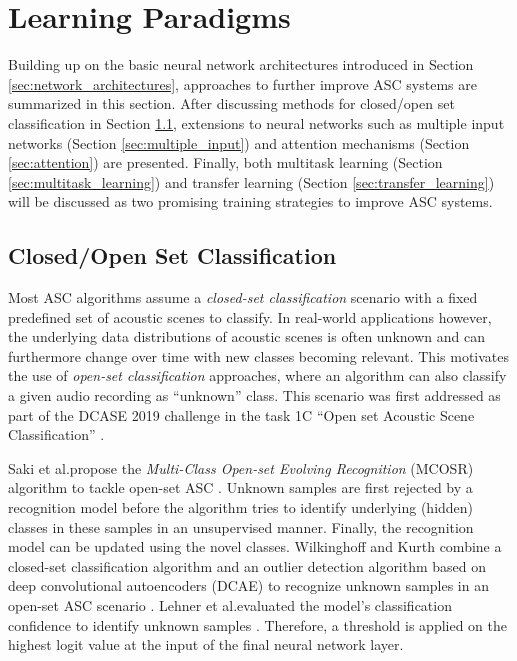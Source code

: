 \documentclass[applsci,article,submit,oneauthor,pdftex]{Definitions/mdpi}
\makeatletter
\newcommand{\etal}{{et al}.\@ }
\newcommand{\secref}[1]{{Section \ref{#1}}}
\makeatother
\begin{document}
\section{Learning Paradigms}
\label{sec:learning_paradigms}
Building up on the basic neural network architectures introduced in \secref{sec:network_architectures}, approaches to further improve ASC systems are summarized in this section.
After discussing methods for closed/open set classification in \secref{sec:open_closed_set}, extensions to neural networks such as multiple input networks (\secref{sec:multiple_input}) and attention mechanisms (\secref{sec:attention}) are presented.
Finally, both multitask learning (\secref{sec:multitask_learning}) and transfer learning (\secref{sec:transfer_learning}) will be discussed as two promising training strategies to improve ASC systems.

\subsection{Closed/Open Set Classification}
\label{sec:open_closed_set}

Most ASC algorithms assume a \textit{closed-set classification} scenario with a fixed predefined set of acoustic scenes to classify.
In real-world applications however, the underlying data distributions of acoustic scenes is often unknown and can furthermore change over time with new classes becoming relevant.
This motivates the use of \textit{open-set classification} approaches, where an  algorithm can also classify a given audio recording as ``unknown'' class.
This scenario was first addressed as part of the DCASE 2019 challenge in the task 1C ``Open set Acoustic Scene Classification'' \citep{Mesaros:2019:ClosedOpenSet:DCASE}.

Saki \etal propose the \textit{Multi-Class Open-set Evolving Recognition} (MCOSR) algorithm to tackle open-set ASC \citep{Saki:2019:OpenSetASC:DCASE}.
Unknown samples are first rejected by a recognition model before the algorithm tries to identify underlying (hidden) classes in these samples in an unsupervised manner. 
Finally, the recognition model can be updated using the novel classes.
Wilkinghoff and Kurth combine a closed-set classification algorithm and an outlier detection algorithm based on deep convolutional autoencoders (DCAE) to recognize unknown samples in an open-set ASC scenario \citep{Wilkinghoff:2019:OpenSetASC:DCASE}.
Lehner \etal evaluated the model's classification confidence to identify unknown samples \citep{Lehner:2019:ASCReject:DCASE}. Therefore, a threshold is applied on the highest logit value at the input of the final neural network layer.
\end{document}
